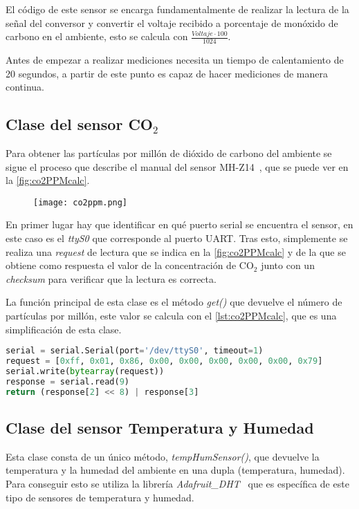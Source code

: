 El código de este sensor se encarga fundamentalmente de realizar la lectura de la señal del conversor y convertir el voltaje recibido a porcentaje de monóxido de carbono en el ambiente, esto se calcula con $\frac{\textit{Voltaje}\cdot 100}{1024}$.

Antes de empezar a realizar mediciones necesita un tiempo de calentamiento de 20 segundos, a partir de este punto es capaz de hacer mediciones de manera continua.

\subsection{Clase del sensor \texorpdfstring{CO$_2$}{CO2}}\label{subsec:clase-del-sensor-co2}
Para obtener las partículas por millón de dióxido de carbono del ambiente se sigue el proceso que describe el manual del sensor MH-Z14~\cite{zhengzhou_winsen_electronics_technology_users_nodate}, que se puede ver en la \autoref{fig:co2PPMcalc}.
\begin{figure}[H]
	{\texttt{[image: co2ppm.png]}}
\end{figure}
En primer lugar hay que identificar en qué puerto serial se encuentra el sensor, en este caso es el \textit{ttyS0} que corresponde al puerto UART. Tras esto, simplemente se realiza una \textit{request} de lectura que se indica en la \autoref{fig:co2PPMcalc} y de la que se obtiene como respuesta el valor de la concentración de CO$_2$ junto con un \textit{checksum} para verificar que la lectura es correcta.

La función principal de esta clase es el método \textit{get()} que devuelve el número de partículas por millón, este valor se calcula con el \autoref{lst:co2PPMcalc}, que es una simplificación de esta clase.
\begin{lstlisting}[language=Python, label=lst:co2PPMcalc, caption=Cálculo de la concentración de CO$_2$]
serial = serial.Serial(port='/dev/ttyS0', timeout=1)
request = [0xff, 0x01, 0x86, 0x00, 0x00, 0x00, 0x00, 0x00, 0x79]
serial.write(bytearray(request))
response = serial.read(9)
return (response[2] << 8) | response[3]
\end{lstlisting}

\subsection{Clase del sensor Temperatura y Humedad}\label{subsec:clase-del-sensor-temperatura-y-humedad}
Esta clase consta de un único método, \textit{tempHumSensor()}, que devuelve la temperatura y la humedad del ambiente en una dupla (temperatura, humedad). Para conseguir esto se utiliza la librería \textit{Adafruit\_DHT}~\cite{adafruit_dht_nodate} que es específica de este tipo de sensores de temperatura y humedad.


